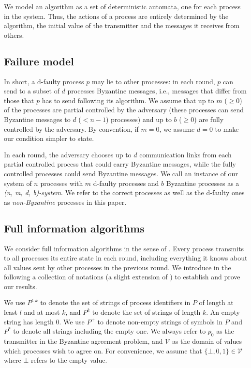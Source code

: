 \documentclass[11pt,conference,compsoc,onecolumn,romanappendices]{IEEEtran}
\newcommand{\tmem}[1]{{\em #1\/}}
\begin{document}
We model an algorithm as a set of deterministic automata, one for each
process in the system. Thus, the actions of a process are entirely determined
by the algorithm, the initial value of the transmitter and the messages it receives from others.

\subsection{Failure model}

In short, a d-faulty process $p$ may lie to other processes: in each round, $p$ can send to
a subset of $d$ processes Byzantine messages, i.e., messages that differ from
those that $p$ has to send following its algorithm. We
assume  that up to $m$ ($\geqslant 0$) of the processes are partial
controlled by the adversary (these processes can send  Byzantine messages to
$d$ ($< n - 1$) processes) and  up to $b$ ($\geqslant 0$) are fully controlled
by the adversary. By convention, if $m=0$, we
assume $d=0$ to make our condition simpler to state.

In each round, the adversary chooses up to $d$ communication links from each partial controlled
process that could carry Byzantine messages, while the fully controlled
processes could send Byzantine messages. We call an instance of our system of $n$
processes with $m$ d-faulty processes and $b$ Byzantine processes as a {\tmem{(n, m, d, b)-system}}.
We refer to the correct processes as well as the d-faulty ones as \tmem{non-Byzantine} processes in this paper.


\subsection{Full information algorithms}

We consider full information algorithms
in the sense of {\cite{fischer1982lower,lamport1982byzantine,lynch1996distributed}}.
Every process transmits to all processes its
entire state in each round, including everything it knows about all values
sent by other processes in the previous round. We introduce in the following
a collection of notations (a slight extension of \cite{fischer1982lower}) to establish and prove our results.

We use $P^{l : k}$ to denote the set of strings of process identifiers in
$P$ of length at least $l$ and at most $k$, and $P^k$ to denote the set of
strings of length $k$. An empty string has length $0$. We
use $P^+$ to denote non-empty strings of symbols in $P$ and $P^{\ast}$ to
denote all strings including the empty one. 
We always refer to
$p_0$ as the transmitter in the Byzantine agreement problem,
and $\mathcal{V}$ as the domain of values which processes 
wish to agree on. For convenience, we assume that $\{\bot, 0, 1\} \in \mathcal{V}$
where $\bot$ refers to the empty value.
\end{document}
